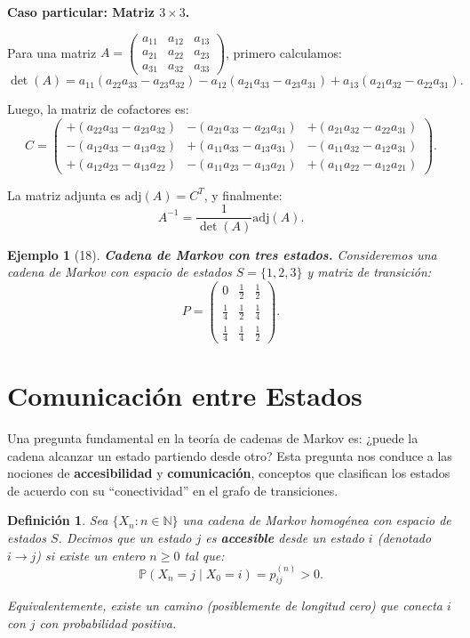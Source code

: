 \documentclass[12pt]{book}
\newtheorem{definition}{Definición}[chapter]
\newtheorem{example}{Ejemplo}[chapter]
\begin{document}
\textbf{Caso particular: Matriz $3 \times 3$.}

Para una matriz $A = \begin{pmatrix} a_{11} & a_{12} & a_{13} \\ a_{21} & a_{22} & a_{23} \\ a_{31} & a_{32} & a_{33} \end{pmatrix}$, primero calculamos:
\[
\det(A) = a_{11}(a_{22}a_{33} - a_{23}a_{32}) - a_{12}(a_{21}a_{33} - a_{23}a_{31}) + a_{13}(a_{21}a_{32} - a_{22}a_{31}).
\]

Luego, la matriz de cofactores es:
\[
C = \begin{pmatrix}
+(a_{22}a_{33} - a_{23}a_{32}) & -(a_{21}a_{33} - a_{23}a_{31}) & +(a_{21}a_{32} - a_{22}a_{31}) \\
-(a_{12}a_{33} - a_{13}a_{32}) & +(a_{11}a_{33} - a_{13}a_{31}) & -(a_{11}a_{32} - a_{12}a_{31}) \\
+(a_{12}a_{23} - a_{13}a_{22}) & -(a_{11}a_{23} - a_{13}a_{21}) & +(a_{11}a_{22} - a_{12}a_{21})
\end{pmatrix}.
\]

La matriz adjunta es $\text{adj}(A) = C^T$, y finalmente:
\[
A^{-1} = \frac{1}{\det(A)} \text{adj}(A).
\]

\begin{example}[18]
\textbf{Cadena de Markov con tres estados.} Consideremos una cadena de Markov con espacio de estados $S = \{1, 2, 3\}$ y matriz de transición:
\[
P = \begin{pmatrix}
0 & \tfrac{1}{2} & \tfrac{1}{2} \\
\tfrac{1}{4} & \tfrac{1}{2} & \tfrac{1}{4} \\
\tfrac{1}{4} & \tfrac{1}{4} & \tfrac{1}{2}
\end{pmatrix}.
\]
\end{example}

\section{Comunicación entre Estados}

Una pregunta fundamental en la teoría de cadenas de Markov es: ¿puede la cadena alcanzar un estado partiendo desde otro? Esta pregunta nos conduce a las nociones de \textbf{accesibilidad} y \textbf{comunicación}, conceptos que clasifican los estados de acuerdo con su ``conectividad'' en el grafo de transiciones.

\begin{definition}
Sea $\{X_n : n \in \mathbb{N}\}$ una cadena de Markov homogénea con espacio de estados $S$. Decimos que un estado $j$ es \textbf{accesible} desde un estado $i$ (denotado $i \to j$) si existe un entero $n \geq 0$ tal que:
\[
\mathbb{P}(X_n = j \mid X_0 = i) = p_{ij}^{(n)} > 0.
\]

Equivalentemente, existe un camino (posiblemente de longitud cero) que conecta $i$ con $j$ con probabilidad positiva.
\end{definition}
\end{document}
